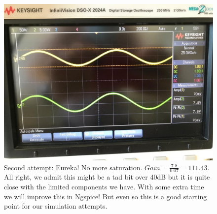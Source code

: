\begin{figure}[H] \centering
\includegraphics[width=0.6\linewidth]{try2_results.jpeg}
\caption{Second attempt: Eureka! No more saturation. $Gain = \frac{7.8}{0.07}=111.43$. All right, we admit this might be a tad bit over 40dB but it is quite close with the limited components we have. With some extra time we will improve this in Ngspice! But even so this is a good starting point for our simulation attempts.}
\label{fig:t22}
\end{figure}
\vspace{-3cm}


\pagebreak

